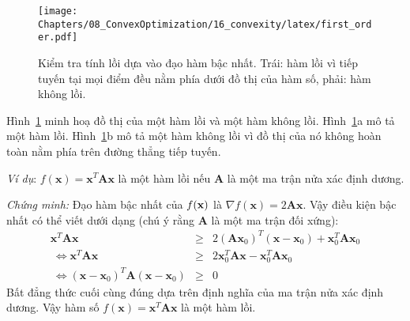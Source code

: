 
\begin{figure}[t]
\centering
\texttt{[image: Chapters/08\_ConvexOptimization/16\_convexity/latex/first\_order.pdf]}
\caption[]{Kiểm tra tính lồi dựa vào đạo hàm bậc nhất. Trái: hàm lồi vì tiếp tuyến tại mọi điểm đều nằm phía dưới đồ thị của hàm số, phải: hàm không lồi.}
\label{fig:16_firstorder}
\end{figure}

Hình~\ref{fig:16_firstorder} minh hoạ đồ thị của một hàm lồi và một hàm không
lồi. Hình~\ref{fig:16_firstorder}a mô tả một hàm lồi.
Hình~\ref{fig:16_firstorder}b mô tả một hàm không lồi vì đồ thị của nó không hoàn toàn nằm phía trên đường thẳng tiếp tuyến.

\textit{Ví dụ}: $f(\mathbf{x}) = \mathbf{x}^T\mathbf{A}\mathbf{x}$ là một hàm lồi nếu  $\mathbf{A}$ là một ma trận {nửa xác định dương}.

\textit{Chứng minh:} Đạo hàm bậc nhất của $f(\mathbf{x})$ là
\begin{math}
\nabla f(\mathbf{x}) = 2\mathbf{A} \mathbf{x}
\end{math}.
Vậy điều kiện bậc nhất có thể viết dưới dạng (chú ý rằng $\mathbf{A}$ là một ma trận đối xứng):
\begin{eqnarray*}
\mathbf{x}^T\mathbf{Ax} &\geq& 2(\mathbf{A}\mathbf{x}_0)^T (\mathbf{x} - \mathbf{x}_0) + \mathbf{x}_0^T\mathbf{A}\mathbf{x}_0 \\\
\Leftrightarrow \mathbf{x}^T\mathbf{Ax} &\geq& 2\mathbf{x}_0^T\mathbf{A}\mathbf{x} -\mathbf{x}_0^T\mathbf{A}\mathbf{x}_0  \\\
\Leftrightarrow (\mathbf{x} - \mathbf{x}_0)^T\mathbf{A}(\mathbf{x} - \mathbf{x}_0) &\geq& 0
\end{eqnarray*}
Bất đẳng thức cuối cùng đúng dựa trên định nghĩa của ma trận {nửa xác
định dương}. Vậy hàm số $f(\mathbf{x}) = \mathbf{x}^T\mathbf{A}\mathbf{x}$ là
một {hàm lồi}. \dpcm


